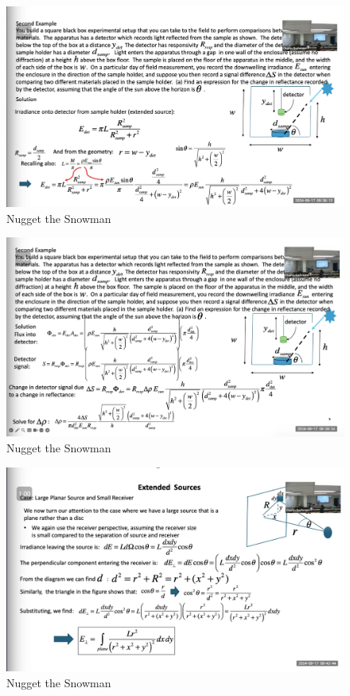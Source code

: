 \documentclass{article}
\begin{document}
\begin{figure}[h!]
\centering
\includegraphics[scale=.6]{Radiometry/Week4/Notes/Sept17/Third.png}
\caption{Nugget the Snowman}
\label{fig:Second}
\end{figure}


\begin{figure}[h!]
\centering
\includegraphics[scale=.6]{Radiometry/Week4/Notes/Sept17/Fourth.png}
\caption{Nugget the Snowman}
\label{fig:Second}
\end{figure}



\begin{figure}[h!]
\centering
\includegraphics[scale=.6]{Radiometry/Week4/Notes/Sept17/Plane.png}
\caption{Nugget the Snowman}
\label{fig:Plane}
\end{figure}
\end{document}
